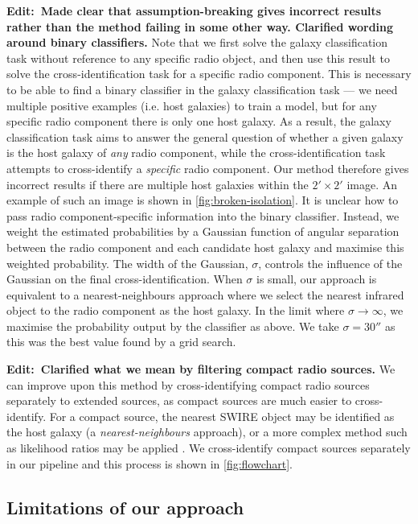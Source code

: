 \documentclass[fleqn,usenatbib,usedcolumn]{mnras}
\newcommand{\edit}[1]{{\bf Edit:~{#1}}}
\begin{document}
    \edit{Made clear that assumption-breaking gives incorrect results rather than the method failing in some other way. Clarified wording around binary classifiers.} Note that we first solve the galaxy classification task without reference to any specific radio object, and then use this result to solve the cross-identification task for a specific radio component. This is necessary to be able to find a binary classifier in the galaxy classification task --- we need multiple positive examples (i.e. host galaxies) to train a model, but for any specific radio component there is only one host galaxy. As a result, the galaxy classification task aims to answer the general question of whether a given galaxy is the host galaxy of \emph{any} radio component, while the cross-identification task attempts to cross-identify a \emph{specific} radio component. Our method therefore gives incorrect results if there are multiple host galaxies within the $2' \times 2'$ image. An example of such an image is shown in \autoref{fig:broken-isolation}. It is unclear how to pass radio component-specific information into the binary classifier. Instead, we weight the estimated probabilities by a Gaussian function of angular separation between the radio component and each candidate host galaxy and maximise this weighted probability. The width of the Gaussian, $\sigma$, controls the influence of the Gaussian on the final cross-identification. When $\sigma$ is small, our approach is equivalent to a nearest-neighbours approach where we select the nearest infrared object to the radio component as the host galaxy. In the limit where $\sigma \to \infty$, we maximise the probability output by the classifier as above. We take $\sigma = 30''$ as this was the best value found by a grid search.

    \edit{Clarified what we mean by filtering compact radio sources.} We can improve upon this method by cross-identifying compact radio sources separately to extended sources, as compact sources are much easier to cross-identify. For a compact source, the nearest SWIRE object may be identified as the host galaxy (a \emph{nearest-neighbours} approach), or a more complex method such as likelihood ratios may be applied \citep[see][]{weston18lrpy}. We cross-identify compact sources separately in our pipeline and this process is shown in \autoref{fig:flowchart}.

  \subsection{Limitations of our approach}
    \label{sec:limitations}
\end{document}
